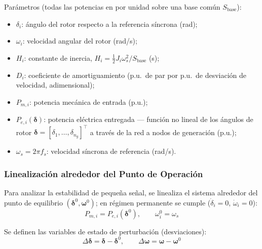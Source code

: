 
Parámetros (todas las potencias en por unidad sobre una base común
$S_{\text{base}}$):

\begin{itemize}
    \item $\delta_i$: ángulo del rotor respecto a la referencia síncrona (rad);
    \item $\omega_i$: velocidad angular del rotor (rad/s);
    \item $H_i$: constante de inercia, $H_i = \tfrac{1}{2}J_i\omega_s^2/S_{\text{base}}$ (s);
    \item $D_i$: coeficiente de amortiguamiento (p.u.\ de par por
          p.u.\ de desviación de velocidad, adimensional);
    \item $P_{m,i}$: potencia mecánica de entrada (p.u.);
    \item $P_{e,i}(\boldsymbol{\delta})$: potencia eléctrica entregada ---
          función no lineal de los ángulos de rotor
          $\boldsymbol{\delta} = [\delta_1, \ldots, \delta_{n_g}]^\top$ a
          través de la red a nodos de generación (p.u.);
    \item $\omega_s = 2\pi f_s$: velocidad síncrona de referencia (rad/s).
\end{itemize}


\subsubsection{Linealización alrededor del Punto de Operación}

Para analizar la estabilidad de pequeña señal, se linealiza el sistema alrededor del punto de equilibrio
$(\boldsymbol{\delta}^0, \boldsymbol{\omega}^0)$; en régimen permanente se cumple ($\dot{\delta}_i = 0$, $\dot{\omega}_i = 0$):
\begin{equation}
    P_{m,i} = P_{e,i}(\boldsymbol{\delta}^0), \qquad \omega_i^0 = \omega_s
\end{equation}

Se definen las variables de estado de perturbación (desviaciones):
\begin{equation}
    \Delta\boldsymbol{\delta} = \boldsymbol{\delta} - \boldsymbol{\delta}^0, \qquad
    \Delta\boldsymbol{\omega} = \boldsymbol{\omega} - \boldsymbol{\omega}^0
\end{equation}

